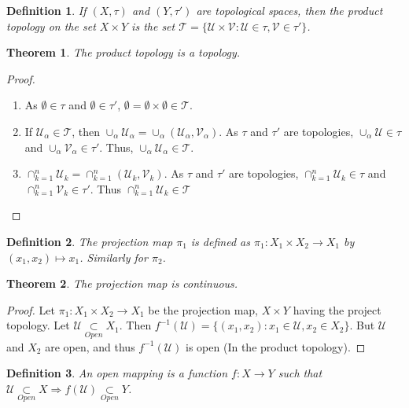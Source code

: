 \documentclass[oneside]{book}
\theoremstyle{mystyle}
\newtheorem{theorem}{Theorem}[section]
\newtheorem{definition}{Definition}[section]
\begin{document}
\begin{definition}
If $(X,\tau)$ and $(Y,\tau')$ are topological spaces, then the product topology on the set $X\times Y$ is the set $\mathscr{T} = \{\mathcal{U}\times \mathcal{V}:\mathcal{U}\in\tau,\mathcal{V}\in \tau'\}$.
\end{definition}

\begin{theorem}
The product topology is a topology.
\end{theorem}
\begin{proof}
\
\begin{enumerate}
\item As $\emptyset \in \tau$ and $\emptyset\in \tau'$, $\emptyset =\emptyset\times \emptyset \in \mathscr{T}$.
\item If $\mathscr{U}_{\alpha}\in \mathscr{T}$, then $\cup_{\alpha} \mathscr{U}_{\alpha} = \cup_{\alpha} (\mathcal{U}_{\alpha},\mathcal{V}_{\alpha})$. As $\tau$ and $\tau'$ are topologies, $\cup_{\alpha} \mathcal{U} \in \tau$ and $\cup_{\alpha}\mathcal{V}_{\alpha} \in \tau'$. Thus, $\cup_{\alpha}\mathscr{U}_{\alpha} \in \mathscr{T}$.
\item $\cap_{k=1}^{n} \mathscr{U}_{k} = \cap_{k=1}^{n} (\mathcal{U}_k,\mathcal{V}_k)$. As $\tau$ and $\tau'$ are topologies, $\cap_{k=1}^{n}\mathcal{U}_k \in \tau$ and $\cap_{k=1}^{n}\mathcal{V}_{k} \in \tau'$. Thus $\cap_{k=1}^{n} \mathscr{U}_k \in \mathscr{T}$
\end{enumerate}
\end{proof}

\begin{definition}
The projection map $\pi_1$ is defined as $\pi_1:X_1\times X_2\rightarrow X_1$ by $(x_1,x_2)\mapsto x_1$. Similarly for $\pi_2$.
\end{definition}

\begin{theorem}
The projection map is continuous.
\end{theorem}
\begin{proof}
Let $\pi_1:X_1\times X_2\rightarrow X_1$ be the projection map, $X\times Y$ having the project topology. Let $\mathcal{U}\underset{Open}\subset X_1$. Then $f^{-1}(\mathcal{U}) = \{(x_1,x_2):x_1\in \mathcal{U}, x_2\in X_2\}$. But $\mathcal{U}$ and $X_2$ are open, and thus $f^{-1}(\mathcal{U})$ is open (In the product topology).
\end{proof}

\begin{definition}
An open mapping is a function $f:X\rightarrow Y$ such that $\mathcal{U}\underset{Open}\subset X\Rightarrow f(\mathcal{U}) \underset{Open}\subset Y$.
\end{definition}
\end{document}
